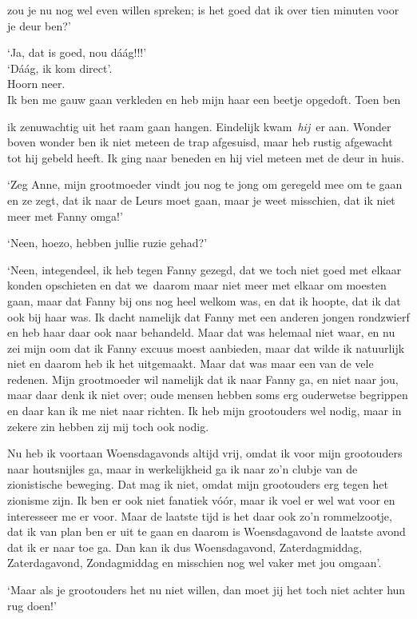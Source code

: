 \documentclass{book}
\begin{document}
zou je nu nog wel even willen spreken; is het goed dat ik over tien minuten voor
je deur ben?'

`Ja, dat is goed, nou dáág!!!'\\
`Dáág, ik kom direct'.\\
Hoorn neer.\\
Ik ben
me gauw gaan verkleden en heb mijn haar een beetje opgedoft. Toen ben

ik zenuwachtig uit het raam gaan hangen. Eindelijk kwam~\emph{hij}~er aan.
Wonder boven wonder ben ik niet meteen de trap afgesuisd, maar heb rustig
afgewacht tot hij gebeld heeft. Ik ging naar beneden en hij viel meteen met de
deur in huis.

`Zeg Anne, mijn grootmoeder vindt jou nog te jong om geregeld mee om te gaan en
ze zegt, dat ik naar de Leurs moet gaan, maar je weet misschien, dat ik niet
meer met Fanny omga!'

`Neen, hoezo, hebben jullie ruzie gehad?'

`Neen, integendeel, ik heb tegen Fanny gezegd, dat we toch niet goed met elkaar
konden opschieten en dat we~daarom maar niet meer met elkaar om moesten gaan,
maar dat Fanny bij ons nog heel welkom was, en dat ik hoopte, dat ik dat ook bij
haar was. Ik dacht namelijk dat Fanny met een anderen jongen rondzwierf en heb
haar daar ook naar behandeld. Maar dat was helemaal niet waar, en nu zei mijn
oom dat ik Fanny excuus moest aanbieden, maar dat wilde ik natuurlijk niet en
daarom heb ik het uitgemaakt. Maar dat was maar een van de vele redenen. Mijn
grootmoeder wil namelijk dat ik naar Fanny ga, en niet naar jou, maar daar denk
ik niet over; oude mensen hebben soms erg ouderwetse begrippen en daar kan ik me
niet naar richten. Ik heb mijn grootouders wel nodig, maar in zekere zin hebben
zij mij toch ook nodig.

Nu heb ik voortaan Woensdagavonds altijd vrij, omdat ik voor mijn grootouders
naar houtsnijles ga, maar in werkelijkheid ga ik naar zo'n clubje van de
zionistische beweging. Dat mag ik niet, omdat mijn grootouders erg tegen het
zionisme zijn. Ik ben er ook niet fanatiek vóór, maar ik voel er wel wat voor en
interesseer me er voor. Maar de laatste tijd is het daar ook zo'n rommelzootje,
dat ik van plan ben er uit te gaan en daarom is Woensdagavond de laatste avond
dat ik er naar toe ga. Dan kan ik dus Woensdagavond, Zaterdagmiddag,
Zaterdagavond, Zondagmiddag en misschien nog wel vaker met jou omgaan'.

`Maar als je grootouders het nu niet willen, dan moet jij het toch niet achter
hun rug doen!'
\end{document}

